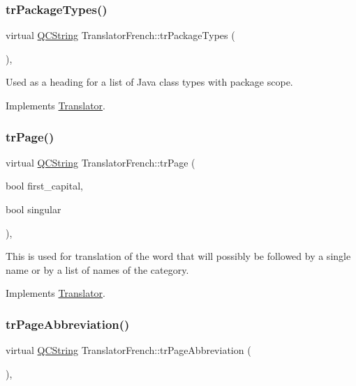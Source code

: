 \subsubsection{\texorpdfstring{trPackageTypes()}{trPackageTypes()}}
{\footnotesize\ttfamily virtual \mbox{\hyperlink{class_q_c_string}{Q\+C\+String}} Translator\+French\+::tr\+Package\+Types (\begin{DoxyParamCaption}{ }\end{DoxyParamCaption})\hspace{0.3cm}{\ttfamily [inline]}, {\ttfamily [virtual]}}

Used as a heading for a list of Java class types with package scope. 

Implements \mbox{\hyperlink{class_translator}{Translator}}.

\mbox{\label{class_translator_french_a48f0caa73ae4de92b476b8694048ede7}} 
\subsubsection{\texorpdfstring{trPage()}{trPage()}}
{\footnotesize\ttfamily virtual \mbox{\hyperlink{class_q_c_string}{Q\+C\+String}} Translator\+French\+::tr\+Page (\begin{DoxyParamCaption}\item[{bool}]{first\+\_\+capital,  }\item[{bool}]{singular }\end{DoxyParamCaption})\hspace{0.3cm}{\ttfamily [inline]}, {\ttfamily [virtual]}}

This is used for translation of the word that will possibly be followed by a single name or by a list of names of the category. 

Implements \mbox{\hyperlink{class_translator}{Translator}}.

\mbox{\label{class_translator_french_ae87e30678e217c9229fa6dca8d2e1d0c}} 
\subsubsection{\texorpdfstring{trPageAbbreviation()}{trPageAbbreviation()}}
{\footnotesize\ttfamily virtual \mbox{\hyperlink{class_q_c_string}{Q\+C\+String}} Translator\+French\+::tr\+Page\+Abbreviation (\begin{DoxyParamCaption}{ }\end{DoxyParamCaption})\hspace{0.3cm}{\ttfamily [inline]}, {\ttfamily [virtual]}}

